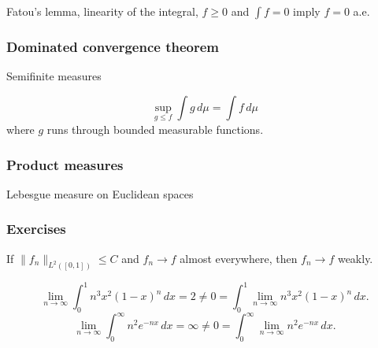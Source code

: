 \documentclass{../../large}
\begin{document}
\begin{prb}
Fatou's lemma, linearity of the integral, $f\ge0$ and $\int f=0$ imply $f=0$ a.e.
\end{prb}


\section{Dominated convergence theorem}


\begin{prb}
\end{prb}

\begin{prb}
Semifinite measures
\begin{parts}
\item
\[\sup_{g\le f}\int g\,d\mu=\int f\,d\mu\]
where $g$ runs through bounded measurable functions.
\item
\end{parts}
\end{prb}


\section{Product measures}

\begin{prb}
Lebesgue measure on Euclidean spaces
\end{prb}




\section*{Exercises}
\begin{prb}
\end{prb}



If $\|f_n\|_{L^2([0,1])}\le C$ and $f_n\to f$ almost everywhere, then $f_n\to f$ weakly.

\[\lim_{n\to\infty}\int_0^1n^3x^2(1-x)^n\,dx=2\ne0=\int_0^1\lim_{n\to\infty}n^3x^2(1-x)^n\,dx.\]
\[\lim_{n\to\infty}\int_0^\infty n^2e^{-nx}\,dx=\infty\ne0=\int_0^\infty\lim_{n\to\infty}n^2e^{-nx}\,dx.\]

\part{}
\end{document}
